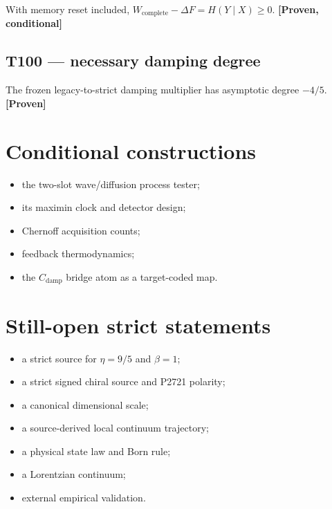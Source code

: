 \documentclass[11pt,a4paper,openany]{report}
\newcommand{\statusProven}{\textcolor{fingreen}{[Proven]}}
\begin{document}
With memory reset included, \(W_{\mathrm{complete}}-\Delta F=H(Y\mid X)\ge0\). \textbf{[Proven, conditional]}

\subsection{T100 --- necessary damping degree}

The frozen legacy-to-strict damping multiplier has asymptotic degree \(-4/5\). \textbf{\statusProven{}}

\section{Conditional constructions}

\begin{itemize}
\item 
the two-slot wave/\allowbreak{}diffusion process tester;

\item 
its maximin clock and detector design;

\item 
Chernoff acquisition counts;

\item 
feedback thermodynamics;

\item 
the \(C_{\mathrm{damp}}\) bridge atom as a target-coded map.

\end{itemize}

\section{Still-open strict statements}

\begin{itemize}
\item 
a strict source for \(\eta=9/5\) and \(\beta=1\);

\item 
a strict signed chiral source and P2721 polarity;

\item 
a canonical dimensional scale;

\item 
a source-derived local continuum trajectory;

\item 
a physical state law and Born rule;

\item 
a Lorentzian continuum;

\item 
external empirical validation.

\end{itemize}
\end{document}
